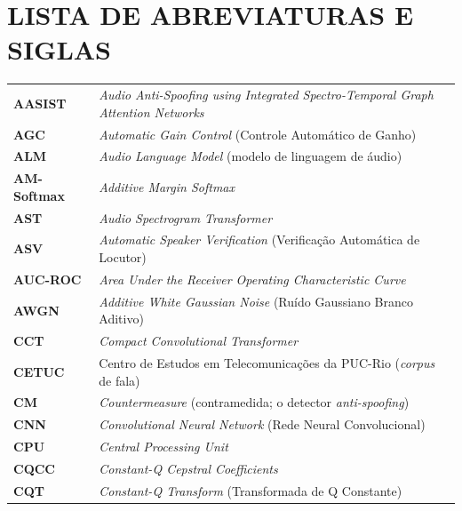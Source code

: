 \documentclass[12pt,a4paper]{article}
\begin{document}
\newpage

\begingroup
\small
{}
\renewcommand{\listfigurename}{LISTA DE FIGURAS}
\listoffigures
\endgroup
\clearpage
\begingroup
\small
{}
\renewcommand{\listtablename}{LISTA DE TABELAS}
\listoftables
\endgroup
\clearpage

\section*{LISTA DE ABREVIATURAS E SIGLAS}
\begingroup
\small
{}
\begin{longtable}{@{}>{\raggedright\arraybackslash}p{2.5cm}
		>{\raggedright\arraybackslash}p{11.3cm}@{}}
	\textbf{AASIST}  & \textit{Audio Anti-Spoofing using Integrated Spectro-Temporal Graph Attention Networks} \\
	\textbf{AGC}     & \textit{Automatic Gain Control} (Controle Automático de Ganho) \\
	\textbf{ALM}     & \textit{Audio Language Model} (modelo de linguagem de áudio) \\
	\textbf{AM-Softmax} & \textit{Additive Margin Softmax} \\
	\textbf{AST}     & \textit{Audio Spectrogram Transformer} \\
	\textbf{ASV}     & \textit{Automatic Speaker Verification} (Verificação Automática de Locutor) \\
	\textbf{AUC-ROC} & \textit{Area Under the Receiver Operating Characteristic Curve} \\
	\textbf{AWGN}    & \textit{Additive White Gaussian Noise} (Ruído Gaussiano Branco Aditivo) \\
	\textbf{CCT}     & \textit{Compact Convolutional Transformer} \\
	\textbf{CETUC}   & Centro de Estudos em Telecomunicações da PUC-Rio (\textit{corpus} de fala) \\
	\textbf{CM}      & \textit{Countermeasure} (contramedida; o detector \textit{anti-spoofing}) \\
	\textbf{CNN}     & \textit{Convolutional Neural Network} (Rede Neural Convolucional) \\
	\textbf{CPU}     & \textit{Central Processing Unit} \\
	\textbf{CQCC}    & \textit{Constant-Q Cepstral Coefficients} \\
	\textbf{CQT}     & \textit{Constant-Q Transform} (Transformada de Q Constante) \\

\end{longtable}
\end{document}
